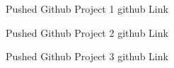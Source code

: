 \resumeSubheading
{Pushed Github Project 1}
{}
{github Link}
{}

\resumeSubheading
{Pushed Github Project 2}
{}
{github Link}
{}

\resumeSubheading
{Pushed Github Project 3}
{}
{github Link}
{}
%
%
%
